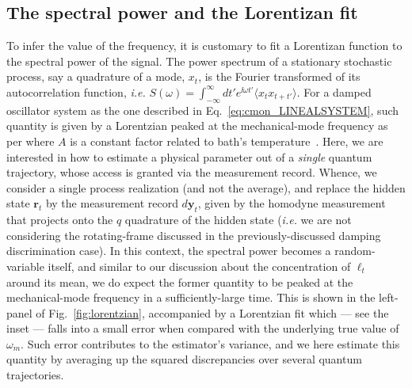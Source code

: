 \subsection{The spectral power and the Lorentizan fit}\label{ssec:lorentzian}
To infer the value of the frequency, it is customary to fit a Lorentizan function to the spectral power of the signal. The power spectrum of a stationary stochastic process, say a quadrature of a mode, $x_{t}$, is the Fourier transformed of its autocorrelation function, \textit{i.e.} $S(\omega) = \int_{-\infty}^\infty dt' e^{\ii \omega t'} \langle x_{t}x_{t+t'}\rangle$. For a damped oscillator system as the one described in Eq.~\ref{eq:cmon_LINEALSYSTEM}, such quantity is given by a Lorentzian peaked at the mechanical-mode frequency as per
where $A$ is a constant factor related to bath's temperature~\cite{clerckintroductionnoise}. Here, we are interested in how to estimate a physical parameter out of a \textit{single} quantum trajectory, whose access is granted via the measurement record. Whence, we consider a single process realization (and not the average), and replace the hidden state $\mathbf{r}_{t}$ by the measurement record $d\mathbf{y}_{t}$, given by the homodyne measurement that projects onto the $q$ quadrature of the hidden state (\textit{i.e.} we are not considering the rotating-frame discussed in the previously-discussed damping discrimination case). In this context, the spectral power becomes a random-variable itself, and similar to our discussion about the concentration of $\ell_{t}$ around its mean, we do expect the former quantity to be peaked at the mechanical-mode frequency in a sufficiently-large time. This is shown in the left-panel of Fig.~\ref{fig:lorentzian}, accompanied by a Lorentzian fit which --- see the inset --- falls into a small error when compared with the underlying true value of $\omega_m$. Such error contributes to the estimator's variance, and we here estimate this quantity by averaging up the squared discrepancies over several quantum trajectories.

